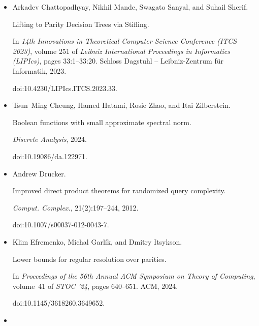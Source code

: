 \begin{itemize}
URL: https://eccc.weizmann.ac.il/report/2024/132/.





\item[] 
[19]

Arkadev Chattopadhyay, Nikhil Mande, Swagato Sanyal, and Suhail Sherif.


Lifting to Parity Decision Trees via Stifling.


In \emph{14th Innovations in Theoretical Computer Science Conference
(ITCS 2023)}, volume 251 of \emph{Leibniz International Proceedings in
Informatics (LIPIcs)}, pages 33:1–33:20. Schloss Dagstuhl – Leibniz-Zentrum
für Informatik, 2023.


doi:10.4230/LIPIcs.ITCS.2023.33.





\item[] 
[20]

Tsun Ming Cheung, Hamed Hatami, Rosie Zhao, and Itai Zilberstein.


Boolean functions with small approximate spectral norm.


\emph{Discrete Analysis}, 2024.


doi:10.19086/da.122971.





\item[] 
[21]

Andrew Drucker.


Improved direct product theorems for randomized query complexity.


\emph{Comput. Complex.}, 21(2):197–244, 2012.


doi:10.1007/s00037-012-0043-7.





\item[] 
[22]

Klim Efremenko, Michal Garlík, and Dmitry Itsykson.


Lower bounds for regular resolution over parities.


In \emph{Proceedings of the 56th Annual ACM Symposium on Theory of
Computing}, volume 41 of \emph{STOC ’24}, pages 640–651. ACM, 2024.


doi:10.1145/3618260.3649652.





\item[] 
[23]


\end{itemize}
